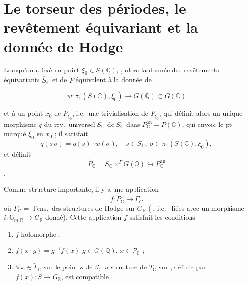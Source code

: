 \documentclass[11pt,a4paper]{article}
\begin{document}
\section{Le torseur des périodes, le revêtement équivariant et la donnée de Hodge}



Lorsqu'on a fixé un point $\xi_{0} \in S(\mathbb{C})$, , alors la donnée des revêtements équivariants
$\overline{S}_{\mathbb{C}}$ et de $\widetilde{P}$ équivalent à la donnée de

\[ w : \pi_{1}(S(\mathbb{C}), \xi_{0}) \longrightarrow G(\mathbb{Q}) \subset G(\mathbb{C}) \]


et à un \struck{\ill{}} point $x_{0}$ de $P_{\xi_{0}}$, i.e.\ une trivialisation
de $P_{\xi_{0}}$, qui définit alors un unique morphisme $q$ du rev.\ universel
$\overline{S}_{\mathbb{C}}$ de $S_{\mathbb{C}}$ dans
$P_{\mathbb{C}}^{\mathrm{an}} = P(\mathbb{C})$, qui envoie le pt marqué
$\overline{\xi}_{0}$ en $x_{0}$ ; il satisfait
\[ q(\overline{s}\,\sigma) = q(\overline{s}) \cdot w(\sigma) , \quad \overline{s} \in \overline{S}_{\mathbb{C}} , \ \sigma \in \pi_{1}(S(\mathbb{C}), \xi_{0}) , \]
et définit
\[ \widetilde{P}_{\mathbb{C}} = \overline{S}_{\mathbb{C}} \times^{\Gamma} G(\mathbb{Q})
\hookrightarrow P_{\mathbb{C}}^{\mathrm{an}} \]
.

Comme structure importante, il y a une application
\[ f : \widetilde{P}_{\mathbb{C}} \longrightarrow \Gamma_{G} \]
où $\Gamma_{G} = $ l'ens.\ des structures de Hodge sur $G_{\mathbb{R}}$
( , i.e.\ \ill{} liées avec un morphisme
$i : \mathbb{G}_{m,\mathbb{R}} \to G_{\mathbb{R}}$ donné). Cette application $f$
satisfait les conditions

\begin{enumerate}
  \item[a)] $f$ holomorphe ;
  \item[b)] $f(x \cdot g) = g^{-1} f(x)$ \quad $g \in G(\mathbb{Q})$, $x \in \widetilde{P}_{\mathbb{C}}$ ;
  \item[c)] $\forall\, x \in \widetilde{P}_{\mathbb{C}}$ sur le point $s$ de $S$,
  la  structure de \ill{} $T_{\mathbb{C}}$ sur
  , définie par
  $f(x) : S \to G_{\mathbb{R}}$, est compatible
\end{enumerate}
\end{document}
